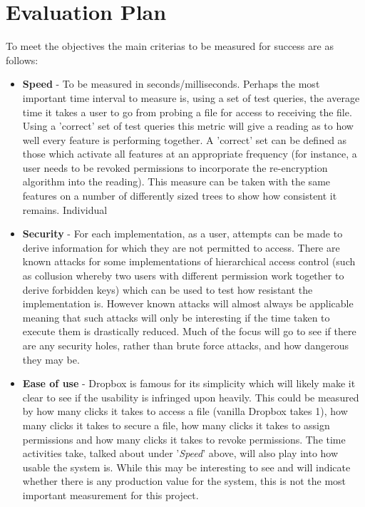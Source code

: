\documentclass[10pt, titlepage]{article}
\begin{document}
\section{Evaluation Plan}
To meet the objectives the main criterias to be measured for success are as follows:
\begin{itemize}
\item \textbf{Speed} - To be measured in seconds/milliseconds. Perhaps the most important time interval to measure is,  using a set of test queries, the average time it takes a user to go from probing a file for access to receiving the file. Using a 'correct' set of test queries this metric will give a reading as to how well every feature is performing together. A 'correct' set can be defined as those which activate all features at an appropriate frequency (for instance, a user needs to be revoked permissions to incorporate the re-encryption algorithm into the reading). This measure can be taken with the same features on a number of differently sized trees to show how consistent it remains.
\newline Individual 
\item \textbf{Security} - For each implementation, as a user, attempts can be made to derive information for which they are not permitted to access. There are known attacks for some implementations of hierarchical access control (such as collusion whereby two users with different permission work together to derive forbidden keys) which can be used to test how resistant the implementation is. However known attacks will almost always be applicable meaning that such attacks will only be interesting if the time taken to execute them is drastically reduced. Much of the focus will go to see if there are any security holes, rather than brute force attacks, and how dangerous they may be.
\item \textbf{Ease of use} - Dropbox is famous for its simplicity which will likely make it clear to see if the usability is infringed upon heavily. This could be measured by how many clicks it takes to access a file (vanilla Dropbox takes 1), how many clicks it takes to secure a file, how many clicks it takes to assign permissions and how many clicks it takes to revoke permissions. The time activities take, talked about under '\textit{Speed}' above, will also play into how usable the system is.
\newline \indent While this may be interesting to see and will indicate whether there is any production value for the system, this is not the most important measurement for this project.
\end{itemize}
\end{document}

